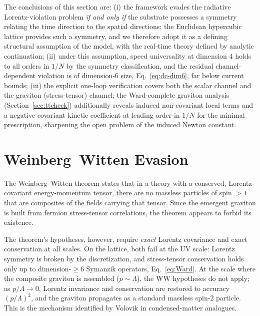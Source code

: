 \documentclass[11pt,a4paper]{article}
\begin{document}
The conclusions of this section are:
(i) the framework evades the radiative Lorentz-violation problem
\emph{if and only if} the substrate possesses a symmetry relating
the time direction to the spatial directions; the Euclidean
hypercubic lattice provides such a symmetry, and we therefore adopt
it as a defining structural assumption of the model, with the
real-time theory defined by analytic continuation;
(ii) under this assumption, speed universality at dimension 4 holds
to all orders in $1/N$ by the symmetry classification, and the
residual channel-dependent violation is of dimension-6 size,
Eq.~\eqref{eq:dc-dim6}, far below current bounds;
(iii) the explicit one-loop verification covers both the scalar
channel and the graviton (stress-tensor) channel; the
Ward-complete graviton analysis (Section~\ref{sec:ttcheck})
additionally reveals induced non-covariant local terms and a
negative covariant kinetic coefficient at leading order in $1/N$
for the minimal prescription, sharpening the open problem of the
induced Newton constant.


\section{Weinberg--Witten Evasion}
\label{sec:WW}

The Weinberg--Witten theorem \cite{Weinberg:1980kq} states that in
a theory with a conserved, Lorentz-covariant energy-momentum
tensor, there are no massless particles of spin $> 1$ that are
composites of the fields carrying that tensor.
Since the emergent graviton is built from fermion stress-tensor
correlations, the theorem appears to forbid its existence.

The theorem's hypotheses, however, require \emph{exact} Lorentz
covariance and exact conservation at all scales.
On the lattice, both fail at the UV scale: Lorentz symmetry is
broken by the discretization, and stress-tensor conservation holds
only up to dimension-$\geq 6$ Symanzik operators,
Eq.~\eqref{eq:Ward}.
At the scale where the composite graviton is assembled
($p \sim \Lambda$), the WW hypotheses do not apply; as
$p/\Lambda \to 0$, Lorentz invariance and conservation are restored
to accuracy $(p/\Lambda)^2$, and the graviton propagates as a
standard massless spin-2 particle.
This is the mechanism identified by Volovik
\cite{Volovik:2003fe} in condensed-matter analogues.
\end{document}

